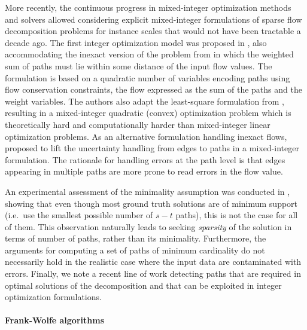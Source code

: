 \documentclass{ecai}
\begin{document}
More recently, the continuous progress in mixed-integer optimization methods and solvers \cite{koch2022progress} allowed considering explicit mixed-integer formulations of sparse flow decomposition problems for instance scales that would not have been tractable a decade ago.
The first integer optimization model was proposed in \cite{dias2022efficient}, also accommodating the inexact version of the problem from \cite{williams2019rna} in which the weighted sum of paths must lie within some distance of the input flow values.
The formulation is based on a quadratic number of variables encoding paths using flow conservation constraints, the flow expressed as the sum of the paths and the weight variables.
The authors also adapt the least-square formulation from \cite{tomescu2015explaining}, resulting in a mixed-integer quadratic (convex) optimization problem which is theoretically hard and computationally harder than mixed-integer linear optimization problems.
As an alternative formulation handling inexact flows, \cite{dias2024accurate} proposed to lift the uncertainty handling from edges to paths in a mixed-integer formulation.
The rationale for handling errors at the path level is that edges appearing in multiple paths are more prone to read errors in the flow value.

An experimental assessment of the minimality assumption was conducted in \cite{kloster2018practical}, showing that even though most ground truth solutions are of minimum support (i.e.~use the smallest possible number of $s-t$ paths), this is not the case for all of them.
This observation naturally leads to seeking \emph{sparsity} of the solution in terms of number of paths, rather than its minimality.
Furthermore, the arguments for computing a set of paths of minimum cardinality do not necessarily hold in the realistic case where the input data are contaminated with errors.
Finally, we note a recent line of work detecting paths that are required in optimal solutions of the decomposition \cite{grigorjew_et_al:LIPIcs.SEA.2024.14,sena2024safe} and that can be exploited in integer optimization formulations.

\paragraph*{Frank-Wolfe algorithms\\}
\end{document}
